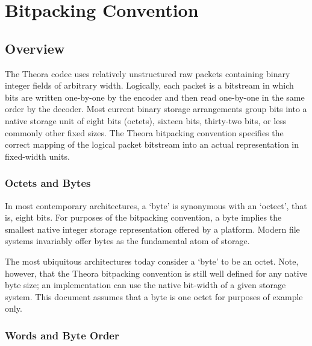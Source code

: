 \documentclass[11pt,letterpaper]{book}
\numberwithin{equation}{chapter}
\numberwithin{figure}{chapter}
\numberwithin{table}{chapter}
\begin{document}


\chapter{Bitpacking Convention}
\label{sec:bitpacking}

\section{Overview}

The Theora codec uses relatively unstructured raw packets containing
 binary integer fields of arbitrary width.
Logically, each packet is a bitstream in which bits are written one-by-one by
 the encoder and then read one-by-one in the same order by the decoder.
Most current binary storage arrangements group bits into a native storage unit
 of eight bits (octets), sixteen bits, thirty-two bits, or less commonly other
 fixed sizes.
The Theora bitpacking convention specifies the correct mapping of the logical
 packet bitstream into an actual representation in fixed-width units.

\subsection{Octets and Bytes}

In most contemporary architectures, a `byte' is synonymous with an `octect',
 that is, eight bits.
For purposes of the bitpacking convention, a byte implies the smallest native
 integer storage representation offered by a platform.
Modern file systems invariably offer bytes as the fundamental atom of storage.

The most ubiquitous architectures today consider a `byte' to be an octet.
Note, however, that the Theora bitpacking convention is still well defined for
 any native byte size; an implementation can use the native bit-width of a
 given storage system.
This document assumes that a byte is one octet for purposes of example only.

\subsection{Words and Byte Order}
\end{document}

